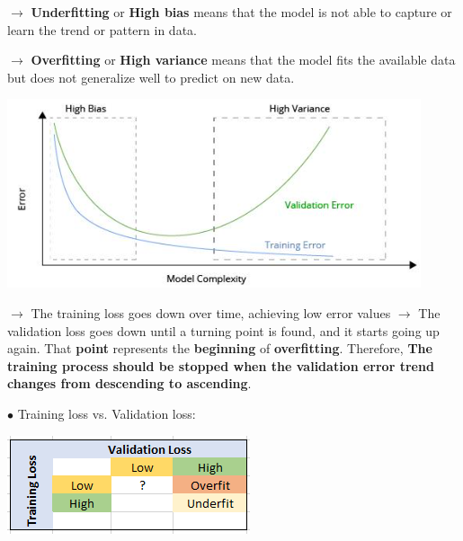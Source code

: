 \documentclass[letterpaper, 10.5pt,landscape]{article}
\begin{document}
\begin{multicols*}{3}
$\rightarrow$ \textbf{Underfitting} or \textbf{High bias} means that the model is not able to capture or learn the trend or pattern in data.

$\rightarrow$ \textbf{Overfitting} or \textbf{High variance} means that the model fits the available data but does not generalize well to predict on new data.

\begin{center}
    \begin{minipage}{0.8\linewidth}
        \includegraphics[width=\textwidth]{figures/Tradeoff_Learning_Curves.PNG}
    \end{minipage}
\end{center}

$\rightarrow$ The training loss goes down over time, achieving low error values
$\rightarrow$ The validation loss goes down until a turning point is found, and it starts going up again. That \textbf{point} represents the \textbf{beginning} of \textbf{overfitting}. Therefore, \textbf{The training process should be stopped when the validation error trend changes from descending to ascending}.


\vspace{3pt}

$\bullet$ Training loss vs. Validation loss:
\vspace{-3pt}
\begin{center}
    \begin{minipage}{0.60\linewidth}
        \includegraphics[width=\textwidth]{figures/Training_Validation_Loss.PNG}
    \end{minipage}
\end{center}


\end{multicols*}
\end{document}
